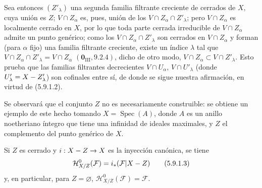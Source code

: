 \begin{env}[5.9.1]
Sea entonces $(Z'_\lambda)$ una segunda familia filtrante creciente de
cerrados de $X$, cuya unión es $Z$; $V\cap Z_\alpha$ es, pues, unión de los
$V\cap Z_\alpha\cap Z'_\lambda$; pero $V\cap Z_\alpha$ es localmente cerrado
en $X$, por lo que toda parte cerrada irreducible de $V\cap Z_\alpha$ admite
un punto genérico; como los $V\cap Z_\alpha\cap Z'_\lambda$ son cerrados en
$V\cap Z_\alpha$ y forman (para $\alpha$ fijo) una familia filtrante
creciente, existe un índice $\lambda$ tal que
$V\cap Z_\alpha\cap Z'_\lambda=V\cap Z_\alpha$
$(\mathbf{0}_{\mathrm{III}},9.2.4)$, dicho de otro modo,
$V\cap Z_\alpha\subset V\cap Z'_\lambda$. Esto prueba que las familias
filtrantes decrecientes $V\cap U_\alpha$, $V\cap U'_\lambda$ (donde
$U'_\lambda=X- Z'_\lambda$) son cofinales entre sí, de donde se sigue nuestra
afirmación, en virtud de (5.9.1.2).
\end{env}


Se observará que el conjunto $Z$ no es necesariamente construible: se obtiene
un ejemplo de este hecho tomando $X=\operatorname{Spec}(A)$, donde $A$ es un
anillo noetheriano íntegro que tiene una infinidad de ideales maximales, y
$Z$ el complemento del punto genérico de $X$.

Si $Z$ es cerrado y $i:X- Z\to X$ es la inyección canónica, se tiene
\begin{equation}
\mathcal H^0_{X/Z}(\mathcal F)=i_*(\mathcal F|X- Z)
\tag{5.9.1.3}\label{IV.2.s5.9.1.3-fr}
\end{equation}
y, en particular, para $Z=\varnothing$,
$\mathcal H^0_{X/Z}(\mathcal F)=\mathcal F$.

